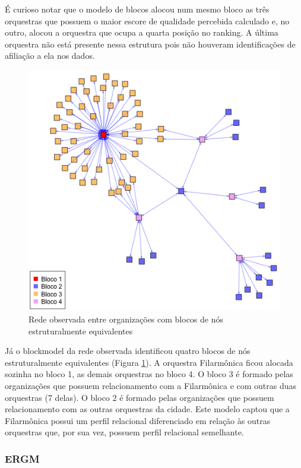 \documentclass[a4paper, 12pt, openright, oneside, german, french, english, brazil]{abntex2}
\begin{document}
	
	É curioso notar que o modelo de blocos alocou num mesmo bloco as três orquestras que possuem o maior escore de qualidade percebida calculado e, no outro, alocou a orquestra que ocupa a quarta posição no ranking. A última orquestra não está presente nessa estrutura pois não houveram identificações de afiliação a ela nos dados.
	
	
	\begin{figure}[!ht]
		\centering
		\caption{Rede observada entre organizações com blocos de nós estruturalmente equivalentes}
		\label{blocos:orgs}
		\includegraphics[scale=.7]{block_nivel2_observado.png}
	\end{figure}

	Já o blockmodel da rede observada identificou quatro blocos de nós estruturalmente equivalentes (Figura \ref{blocos:orgs}). A orquestra Filarmônica ficou alocada sozinha no bloco 1, as demais orquestras no bloco 4. O bloco 3 é formado pelas organizações que possuem relacionamento com a Filarmônica e com outras duas orquestras (7 delas). O bloco 2 é formado pelas organizações que possuem relacionamento com as outras orquestras da cidade. Este modelo captou que a Filarmônica possui um perfil relacional diferenciado em relação às outras orquestras que, por sua vez, possuem perfil relacional semelhante.
	
	\subsubsection{ERGM}
	
\end{document}
